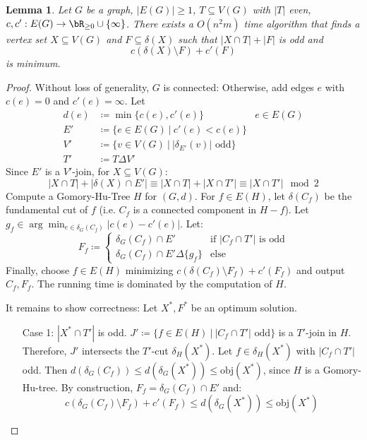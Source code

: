 \documentclass[11pt, a4paper]{article}
\newcommand{\abs}[1]{\left\lvert#1\right\rvert}
\newcommand{\set}[1]{\{#1\}}
\newtheorem{lemma}[theorem]{Lemma}
\theoremstyle{remark}
\theoremstyle{definition}
\begin{document}
\begin{lemma}\label{lemma:padberg-rao}
	Let $G$ be a graph, $\abs{E(G)}\geq1$, $T\subseteq V(G)$ with $\abs{T}$
	even, $c,c': E(G) \to \bR_{\geq0}\cup\set{\infty}$. There exists a
	$O(n^2m)$ time algorithm that finds a vertex set $X\subseteq V(G)$ and
	$F\subseteq \delta(X)$ such that $\abs{X\cap T}+\abs{F}$ is odd and
	\[c(\delta(X)\setminus F)+c'(F)\]
	is minimum.
\end{lemma}
\begin{proof}
	Without loss of generality, $G$ is connected: Otherwise, add edges $e$
	with $c(e)=0$ and $c'(e)=\infty$. Let
	\begin{align*}
		d(e) & \coloneqq\min\set{c(e),c'(e)}                                 & e\in E(G) \\
		E'   & \coloneqq \set{e\in E(G)\ |\ c'(e)<c(e)}                                  \\
		V'   & \coloneqq \set{v\in V(G)\ |\ \abs{\delta_{E'}(v)}\text{ odd}}             \\
		T'   & \coloneqq T\Delta V'
	\end{align*}
	Since $E'$ is a $V'$-join, for $X\subseteq V(G)$:
	\[\abs{X\cap T}+\abs{\delta(X)\cap E'}\equiv \abs{X\cap T}+\abs{X\cap T'}
		\equiv \abs{X\cap T'} \mod 2\]
	Compute a Gomory-Hu-Tree $H$ for $(G,d)$. For $f\in E(H)$, let
	$\delta(C_f)$ be the fundamental cut of $f$ (i.e. $C_f$ is a
	connected component in $H-f$). Let
	$g_f\in\arg\min_{e\in\delta_G(C_f)}\abs{c(e)-c'(e)}$. Let:
	\[F_f\coloneqq\begin{cases}
			\delta_G(C_f)\cap E'                & \text{if $\abs{C_f\cap T'}$ is odd} \\
			\delta_G(C_f)\cap E'\Delta\set{g_f} & \text{else}
		\end{cases}\]
	Finally, choose $f\in E(H)$ minimizing $c(\delta(C_f)\setminus
		F_f)+c'(F_f)$ and output $C_f,F_f$. The running time is dominated by
	the computation of $H$.

	It remains to show correctness: Let $X^*,F^*$ be an optimum solution.
	\begin{enumerate}
		\item[Case 1:] $\abs{X^*\cap T'}$ is odd. $J'\coloneqq\set{f\in E(H)\ |\
				\abs{C_f \cap T'}\text{ odd}}$ is a $T'$-join in $H$. Therefore, $J'$
		intersects the $T'$-cut $\delta_H(X^*)$. Let $f\in\delta_H(X^*)$ with
		$\abs{C_f \cap T'}$ odd. Then $d(\delta_G(C_f))\leq
			d(\delta_G(X^*))\leq\mathrm{obj}(X^*)$, since $H$ is a
		Gomory-Hu-tree. By construction, $F_f=\delta_G(C_f)\cap E'$ and:
		\[c(\delta_G(C_f)\setminus F_f)+c'(F_f)\leq d(\delta_G(X^*))\leq\mathrm{obj}(X^*)\]


\end{enumerate}
\end{proof}
\end{document}

